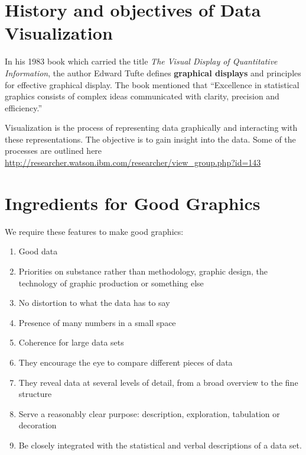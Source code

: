 \documentclass[
  10pt,
]{krantz}
\providecommand{\tightlist}{%
  \setlength{\itemsep}{0pt}\setlength{\parskip}{0pt}}
\begin{document}
\hypertarget{history-and-objectives-of-data-visualization}{%
\section{History and objectives of Data Visualization}\label{history-and-objectives-of-data-visualization}}

In his 1983 book which carried the title \emph{The Visual Display of Quantitative Information}, the author Edward Tufte defines \textbf{graphical displays} and principles for effective graphical display. The book mentioned that ``Excellence in statistical graphics consists of complex ideas communicated with clarity, precision and efficiency.''

Visualization is the process of representing data graphically and interacting with these representations. The objective is to gain insight into the data. Some of the processes are outlined here \url{http://researcher.watson.ibm.com/researcher/view_group.php?id=143}

\hypertarget{ingredients-for-good-graphics}{%
\section{Ingredients for Good Graphics}\label{ingredients-for-good-graphics}}

We require these features to make good graphics:

\begin{enumerate}
\def\labelenumi{\arabic{enumi}.}
\tightlist
\item
  Good data
\item
  Priorities on substance rather than methodology, graphic design, the technology of graphic production or something else
\item
  No distortion to what the data has to say
\item
  Presence of many numbers in a small space
\item
  Coherence for large data sets
\item
  They encourage the eye to compare different pieces of data
\item
  They reveal data at several levels of detail, from a broad overview to the fine structure
\item
  Serve a reasonably clear purpose: description, exploration, tabulation or decoration
\item
  Be closely integrated with the statistical and verbal descriptions of a data set.
\end{enumerate}
\end{document}
